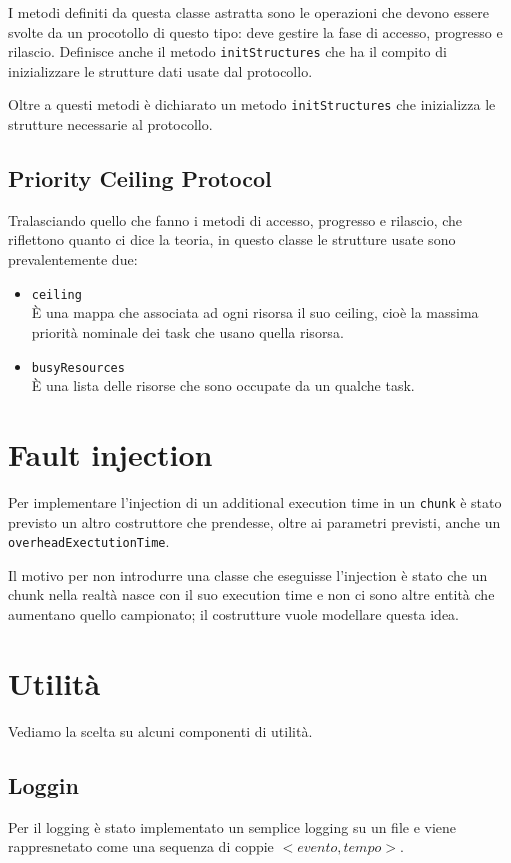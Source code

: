 I metodi definiti da questa classe astratta sono le operazioni che devono essere svolte da un procotollo di questo tipo: deve gestire la fase di accesso, progresso e rilascio. Definisce anche il metodo \texttt{initStructures} che ha il compito di inizializzare le strutture dati usate dal protocollo.

Oltre a questi metodi è dichiarato un metodo \texttt{initStructures} che inizializza le strutture necessarie al protocollo.

\subsection{Priority Ceiling Protocol}
Tralasciando quello che fanno i metodi di accesso, progresso e rilascio, che riflettono quanto ci dice la teoria, in questo classe le strutture usate sono prevalentemente due:
\begin{itemize}
    \item \texttt{ceiling} \\
        È una mappa che associata ad ogni risorsa il suo ceiling, cioè la massima priorità nominale dei task che usano quella risorsa.
    \item \texttt{busyResources}\\
        È una lista delle risorse che sono occupate da un qualche task.
\end{itemize}

\section{Fault injection}
Per implementare l'injection di un additional execution time in un \texttt{chunk} è stato previsto un altro costruttore che prendesse, oltre ai parametri previsti, anche un \texttt{overheadExectutionTime}.

Il motivo per non introdurre una classe che eseguisse l'injection è stato che un chunk nella realtà nasce con il suo execution time e non ci sono altre entità che aumentano quello campionato; il costrutture vuole modellare questa idea.

\section{Utilità}
Vediamo la scelta su alcuni componenti di utilità.

\subsection{Loggin}
Per il logging è stato implementato un semplice logging su un file e viene rappresnetato come una sequenza di coppie $<evento,tempo>$.

